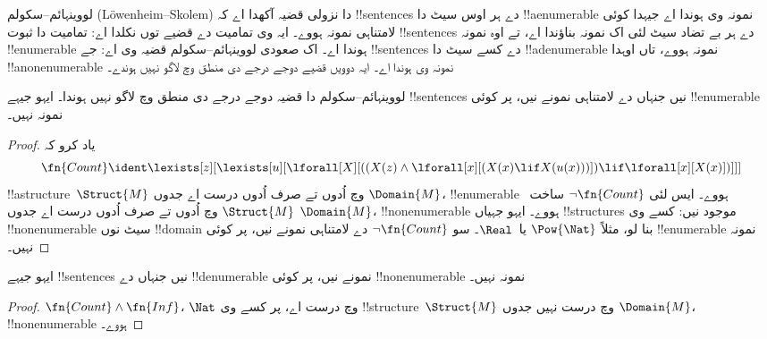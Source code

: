 \documentclass[../../../include/open-logic-section]{subfiles}
\begin{document}


\begin{explain}
لووینہائم--سکولم (L\"owenheim--Skolem) دا نزولی قضیہ آکھدا اے
کہ !!{sentence}s دے ہر اوس سیٹ دا !!a{enumerable} نمونہ وی ہوندا اے
جیہدا کوئی لامتناہی نمونہ ہووے۔ ایہ وی تمامیت دے قضیے توں نکلدا
اے: تمامیت دا ثبوت !!{sentence}s دے ہر بے تضاد سیٹ لئی اک نمونہ
بناؤندا اے، تے اوہ نمونہ !!{enumerable} ہوندا اے۔ اک صعودی
لووینہائم--سکولم قضیہ وی اے: جے !!{sentence}s دے کسے سیٹ دا
!!a{denumerable} نمونہ ہووے، تاں اوہدا !!a{nonenumerable}
نمونہ وی ہوندا اے۔ ایہ دوویں قضیے دوجے درجے دی منطق وچ لاگو نہیں ہوندے۔
\end{explain}


\begin{thm}
 لووینہائم--سکولم دا قضیہ دوجے درجے دی منطق وچ
لاگو نہیں ہوندا۔ ایہو جیہے !!{sentence}s
نیں جنہاں دے لامتناہی نمونے نیں، پر کوئی !!{enumerable} نمونہ نہیں۔
\end{thm}

\begin{proof}
یاد کرو کہ
\[
\fn{Count} \ident \lexists[z][\lexists[u][\lforall[X][((X(z) \land
      \lforall[x][(X(x) \lif X(u(x)))]) \lif \lforall[x][X(x)])]]]
\]
!!a{structure}~$\Struct{M}$ وچ اُدوں تے صرف اُدوں درست اے جدوں
$\Domain{M}$، !!{enumerable} ہووے۔ ایس لئی $\lnot\fn{Count}$
ساخت~$\Struct{M}$ وچ اُدوں تے صرف اُدوں درست اے جدوں
$\Domain{M}$، !!{nonenumerable} ہووے۔ ایہو جہیاں !!{structure}s
موجود نیں: کسے وی !!{nonenumerable} سیٹ نوں !!{domain} بنا لو،
مثلاً $\Pow{\Nat}$ یا~$\Real$۔ سو $\lnot \fn{Count}$ دے
لامتناہی نمونے نیں، پر کوئی !!{enumerable} نمونہ نہیں۔
\end{proof}

\begin{thm}
ایہو جیہے !!{sentence}s نیں جنہاں دے !!{denumerable} نمونے نیں،
پر کوئی !!{nonenumerable} نمونہ نہیں۔
\end{thm}

\begin{proof}
$\fn{Count} \land \fn{Inf}$، $\Nat$ وچ درست اے، پر کسے وی
!!{structure}~$\Struct{M}$ وچ درست نہیں جدوں $\Domain{M}$،
!!{nonenumerable} ہووے۔
\end{proof}
\end{document}
